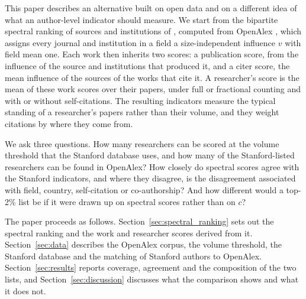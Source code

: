 This paper describes an alternative built on open data and on a different idea of what an author-level indicator should measure. We start from the bipartite spectral ranking of sources and institutions of \citet{docampodomingoRecirculatingCardinalSpectral2026}, computed from OpenAlex \citep{priemOpenAlexFullyopenIndex2022}, which assigns every journal and institution in a field a size-independent influence $v$ with field mean one. Each work then inherits two scores: a publication score, from the influence of the source and institutions that produced it, and a citer score, the mean influence of the sources of the works that cite it. A researcher's score is the mean of these work scores over their papers, under full or fractional counting and with or without self-citations. The resulting indicators measure the typical standing of a researcher's papers rather than their volume, and they weight citations by where they come from.

We ask three questions. How many researchers can be scored at the volume threshold that the Stanford database uses, and how many of the Stanford-listed researchers can be found in OpenAlex? How closely do spectral scores agree with the Stanford indicators, and where they disagree, is the disagreement associated with field, country, self-citation or co-authorship? And how different would a top-2\% list be if it were drawn up on spectral scores rather than on $c$?

The paper proceeds as follows. Section~\ref{sec:spectral_ranking} sets out the spectral ranking and the work and researcher scores derived from it. Section~\ref{sec:data} describes the OpenAlex corpus, the volume threshold, the Stanford database and the matching of Stanford authors to OpenAlex. Section~\ref{sec:results} reports coverage, agreement and the composition of the two lists, and Section~\ref{sec:discussion} discusses what the comparison shows and what it does not.
